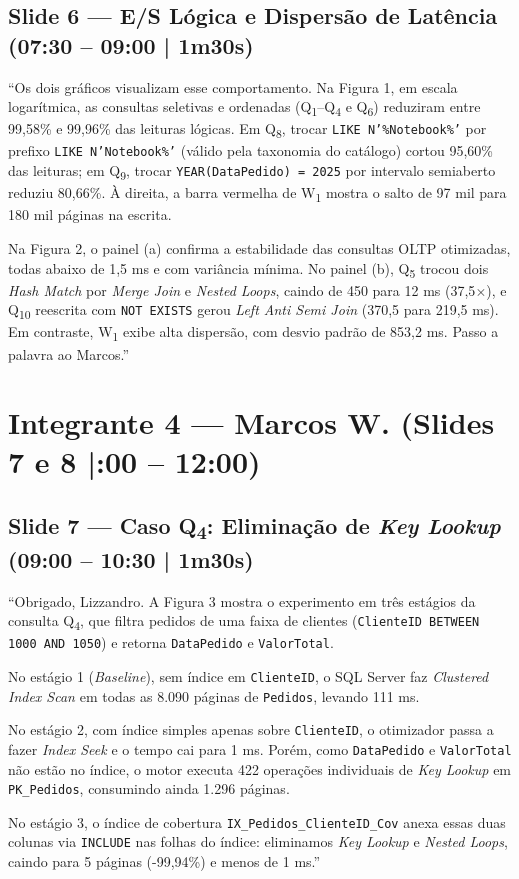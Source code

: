 \documentclass[10pt,a4paper]{article}
\begin{document}
\subsection{Slide 6 — E/S Lógica e Dispersão de Latência (07:30 – 09:00 | 1m30s)}
\begin{fala}
``Os dois gráficos visualizam esse comportamento. Na Figura 1, em escala logarítmica, as consultas seletivas e ordenadas (Q\textsubscript{1}–Q\textsubscript{4} e Q\textsubscript{6}) reduziram entre 99,58\% e 99,96\% das leituras lógicas. Em Q\textsubscript{8}, trocar \texttt{LIKE N'\%Notebook\%'} por prefixo \texttt{LIKE N'Notebook\%'} (válido pela taxonomia do catálogo) cortou 95,60\% das leituras; em Q\textsubscript{9}, trocar \texttt{YEAR(DataPedido) = 2025} por intervalo semiaberto reduziu 80,66\%. À direita, a barra vermelha de W\textsubscript{1} mostra o salto de 97 mil para 180 mil páginas na escrita.

Na Figura 2, o painel (a) confirma a estabilidade das consultas OLTP otimizadas, todas abaixo de 1,5 ms e com variância mínima. No painel (b), Q\textsubscript{5} trocou dois \textit{Hash Match} por \textit{Merge Join} e \textit{Nested Loops}, caindo de 450 para 12 ms (37,5$\times$), e Q\textsubscript{10} reescrita com \texttt{NOT EXISTS} gerou \textit{Left Anti Semi Join} (370,5 para 219,5 ms). Em contraste, W\textsubscript{1} exibe alta dispersão, com desvio padrão de 853,2 ms. Passo a palavra ao Marcos.''
\end{fala}

\section{Integrante 4 — Marcos W. (Slides 7 e 8 \enspace|:00 – 12:00)}

\subsection{Slide 7 — Caso Q\textsubscript{4}: Eliminação de \textit{Key Lookup} (09:00 – 10:30 | 1m30s)}
\begin{fala}
``Obrigado, Lizzandro. A Figura 3 mostra o experimento em três estágios da consulta Q\textsubscript{4}, que filtra pedidos de uma faixa de clientes (\texttt{ClienteID BETWEEN 1000 AND 1050}) e retorna \texttt{DataPedido} e \texttt{ValorTotal}.

No estágio 1 (\textit{Baseline}), sem índice em \texttt{ClienteID}, o SQL Server faz \textit{Clustered Index Scan} em todas as 8.090 páginas de \texttt{Pedidos}, levando 111 ms.

No estágio 2, com índice simples apenas sobre \texttt{ClienteID}, o otimizador passa a fazer \textit{Index Seek} e o tempo cai para 1 ms. Porém, como \texttt{DataPedido} e \texttt{ValorTotal} não estão no índice, o motor executa 422 operações individuais de \textit{Key Lookup} em \texttt{PK\_Pedidos}, consumindo ainda 1.296 páginas.

No estágio 3, o índice de cobertura \texttt{IX\_Pedidos\_ClienteID\_Cov} anexa essas duas colunas via \texttt{INCLUDE} nas folhas do índice: eliminamos \textit{Key Lookup} e \textit{Nested Loops}, caindo para 5 páginas (-99,94\%) e menos de 1 ms.''
\end{fala}
\end{document}
